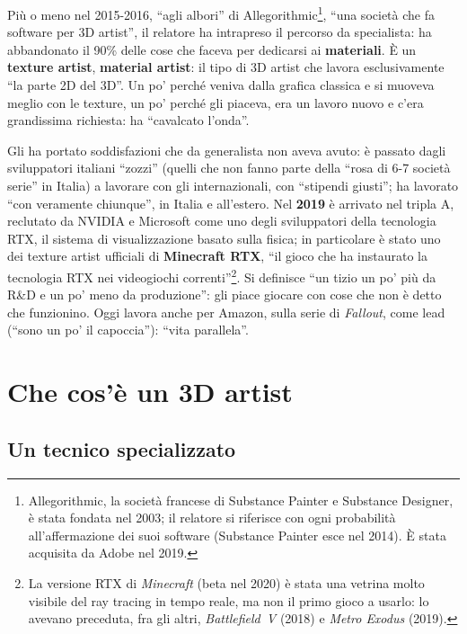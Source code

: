 Più o meno nel 2015-2016, ``agli albori'' di Allegorithmic\footnote{Allegorithmic,
la società francese di Substance Painter e Substance Designer, è stata fondata
nel 2003; il relatore si riferisce con ogni probabilità all'affermazione dei
suoi software (Substance Painter esce nel 2014). È stata acquisita da Adobe nel
2019.}, ``una società che fa software per 3D artist'', il relatore ha
intrapreso il percorso da specialista: ha abbandonato il 90\% delle cose che
faceva per dedicarsi ai \textbf{materiali}. È un \textbf{texture artist},
\textbf{material artist}: il tipo di 3D artist che lavora esclusivamente ``la
parte 2D del 3D''. Un po' perché veniva dalla grafica classica e si muoveva
meglio con le texture, un po' perché gli piaceva, era un lavoro nuovo e c'era
grandissima richiesta: ha ``cavalcato l'onda''.

Gli ha portato soddisfazioni che da generalista non aveva avuto: è passato dagli
sviluppatori italiani ``zozzi'' (quelli che non fanno parte della ``rosa di 6-7
società serie'' in Italia) a lavorare con gli internazionali, con ``stipendi
giusti''; ha lavorato ``con veramente chiunque'', in Italia e all'estero. Nel
\textbf{2019} è arrivato nel tripla A, reclutato da NVIDIA e Microsoft come
uno degli sviluppatori della tecnologia RTX, il sistema di visualizzazione
basato sulla fisica; in particolare è stato uno dei texture artist ufficiali di
\textbf{Minecraft RTX}, ``il gioco che ha instaurato la tecnologia RTX nei
videogiochi correnti''\footnote{La versione RTX di \emph{Minecraft} (beta nel
2020) è stata una vetrina molto visibile del ray tracing in tempo reale, ma non
il primo gioco a usarlo: lo avevano preceduta, fra gli altri,
\emph{Battlefield~V} (2018) e \emph{Metro Exodus} (2019).}. Si definisce ``un
tizio un po' più da R\&D e un po' meno da produzione'': gli piace giocare con
cose che non è detto che funzionino. Oggi lavora anche per Amazon, sulla serie
di \emph{Fallout}, come lead (``sono un po' il capoccia''): ``vita parallela''.

\section{Che cos'è un 3D artist}
\label{p6:sec:cosa}

\subsection{Un tecnico specializzato}

